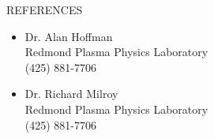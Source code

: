 \documentclass[11pt,oneside]{article}
\newenvironment{ressection}[1]{
	\vspace{4pt}
	{\fontfamily{phv}\selectfont\Large#1}
	\begin{itemize}
	\vspace{3pt}
}{
	\end{itemize}
}
\newcommand{\resitem}[1]{
	\vspace{-4pt}
	\item \begin{flushleft} #1 \end{flushleft}
}
\begin{document}

\begin{ressection}{REFERENCES}
    \resitem{Dr. Alan Hoffman \\
    Redmond Plasma Physics Laboratory\\
    (425) 881-7706}
    \resitem{Dr. Richard Milroy\\
    Redmond Plasma Physics Laboratory\\
    (425) 881-7706}
\end{ressection}
\end{document}
